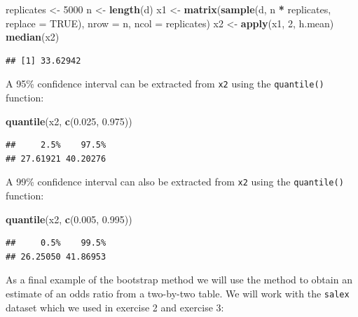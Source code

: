 \documentclass[12pt,a4paper]{book}
\newenvironment{Shaded}{\begin{snugshade}}{\end{snugshade}}
\newcommand{\DataTypeTok}[1]{\textcolor[rgb]{0.13,0.29,0.53}{#1}}
\newcommand{\DecValTok}[1]{\textcolor[rgb]{0.00,0.00,0.81}{#1}}
\newcommand{\FloatTok}[1]{\textcolor[rgb]{0.00,0.00,0.81}{#1}}
\newcommand{\KeywordTok}[1]{\textcolor[rgb]{0.13,0.29,0.53}{\textbf{#1}}}
\newcommand{\NormalTok}[1]{#1}
\newcommand{\OperatorTok}[1]{\textcolor[rgb]{0.81,0.36,0.00}{\textbf{#1}}}
\newcommand{\OtherTok}[1]{\textcolor[rgb]{0.56,0.35,0.01}{#1}}
\newcommand{\StringTok}[1]{\textcolor[rgb]{0.31,0.60,0.02}{#1}}
\theoremstyle{definition}
\theoremstyle{definition}
\theoremstyle{definition}
\theoremstyle{remark}
\begin{document}
\begin{Shaded}
\begin{Highlighting}[]
\NormalTok{replicates <-}\StringTok{ }\DecValTok{5000}
\NormalTok{n <-}\StringTok{ }\KeywordTok{length}\NormalTok{(d)}
\NormalTok{x1 <-}\StringTok{ }\KeywordTok{matrix}\NormalTok{(}\KeywordTok{sample}\NormalTok{(d, n }\OperatorTok{*}\StringTok{ }\NormalTok{replicates, }\DataTypeTok{replace =} \OtherTok{TRUE}\NormalTok{),}
             \DataTypeTok{nrow =}\NormalTok{ n, }\DataTypeTok{ncol =}\NormalTok{ replicates)}
\NormalTok{x2 <-}\StringTok{ }\KeywordTok{apply}\NormalTok{(x1, }\DecValTok{2}\NormalTok{, h.mean)}
\KeywordTok{median}\NormalTok{(x2)}
\end{Highlighting}
\end{Shaded}

\begin{verbatim}
## [1] 33.62942
\end{verbatim}

A 95\% confidence interval can be extracted from \texttt{x2} using the
\texttt{quantile()} function:

\begin{Shaded}
\begin{Highlighting}[]
\KeywordTok{quantile}\NormalTok{(x2, }\KeywordTok{c}\NormalTok{(}\FloatTok{0.025}\NormalTok{, }\FloatTok{0.975}\NormalTok{))}
\end{Highlighting}
\end{Shaded}

\begin{verbatim}
##     2.5%    97.5% 
## 27.61921 40.20276
\end{verbatim}

A 99\% confidence interval can also be extracted from \texttt{x2} using
the \texttt{quantile()} function:

\begin{Shaded}
\begin{Highlighting}[]
\KeywordTok{quantile}\NormalTok{(x2, }\KeywordTok{c}\NormalTok{(}\FloatTok{0.005}\NormalTok{, }\FloatTok{0.995}\NormalTok{))}
\end{Highlighting}
\end{Shaded}

\begin{verbatim}
##     0.5%    99.5% 
## 26.25050 41.86953
\end{verbatim}

As a final example of the bootstrap method we will use the method to
obtain an estimate of an odds ratio from a two-by-two table. We will
work with the \texttt{salex} dataset which we used in exercise 2 and
exercise 3:
\end{document}
